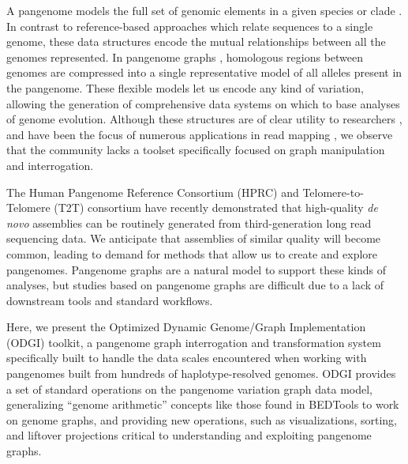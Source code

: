 \documentclass{bioinfo}
\begin{document}
A pangenome models the full set of genomic elements in a given species or clade \citep{cpang2018,Eizenga_2020}.
In contrast to reference-based approaches which relate sequences to a single genome, these data structures encode the mutual relationships between all the genomes represented.
In pangenome graphs \citep{Paten:2017}, homologous regions between genomes are compressed into a single representative model of all alleles present in the pangenome.
These flexible models let us encode any kind of variation, allowing the generation of comprehensive data systems on which to base analyses of genome evolution.
Although these structures are of clear utility to researchers \citep{cpang2018}, and have been the focus of numerous applications in read mapping \citep{Garrison:2018,Baaijens_2019,Hickey:2020,Sibbesen_2021}, we observe that the community lacks a toolset specifically focused on graph manipulation and interrogation.

The Human Pangenome Reference Consortium (HPRC) and Telomere-to-Telomere (T2T) consortium \citep{Miga:2020, Logsdon_2021, Nurk_2021} have recently demonstrated that high-quality \textit{de novo} assemblies can be routinely generated from third-generation long read sequencing data.
We anticipate that assemblies of similar quality will become common, leading to demand for methods that allow us to create and explore pangenomes.
Pangenome graphs are a natural model to support these kinds of analyses, but studies based on pangenome graphs are difficult due to a lack of downstream tools and standard workflows.

Here, we present the Optimized Dynamic Genome/Graph Implementation (ODGI) toolkit, a pangenome graph interrogation and transformation system specifically built to handle the data scales encountered when working with pangenomes built from hundreds of haplotype-resolved genomes.
ODGI provides a set of standard operations on the pangenome variation graph data model, generalizing ``genome arithmetic'' concepts like those found in BEDTools \citep{Quinlan_2010} to work on genome graphs, and providing new operations, such as visualizations, sorting, and liftover projections critical to understanding and exploiting pangenome graphs.

\end{document}
